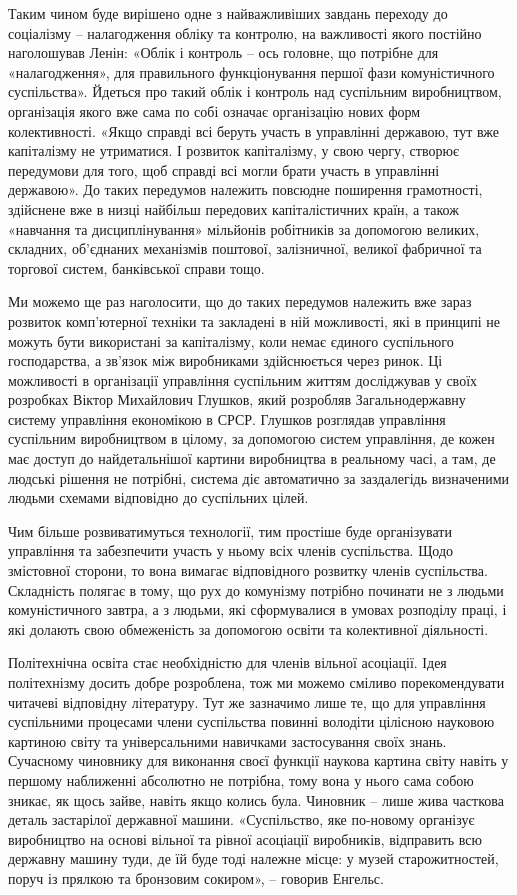 \documentclass[../main]{subfiles}
\begin{document}
Таким чином буде вирішено одне з найважливіших завдань переходу до соціалізму – налагодження обліку та контролю, на важливості якого постійно наголошував Ленін: «Облік і контроль – ось головне, що потрібне для «налагодження», для правильного функціонування першої фази комуністичного суспільства». Йдеться про такий облік і контроль над суспільним виробництвом, організація якого вже сама по собі означає організацію нових форм колективності. «Якщо справді всі беруть участь в управлінні державою, тут вже капіталізму не утриматися. І розвиток капіталізму, у свою чергу, створює передумови для того, щоб справді всі могли брати участь в управлінні державою». До таких передумов належить повсюдне поширення грамотності, здійснене вже в низці найбільш передових капіталістичних країн, а також «навчання та дисциплінування» мільйонів робітників за допомогою великих, складних, об’єднаних механізмів поштової, залізничної, великої фабричної та торгової систем, банківської справи тощо.

Ми можемо ще раз наголосити, що до таких передумов належить вже зараз розвиток комп’ютерної техніки та закладені в ній можливості, які в принципі не можуть бути використані за капіталізму, коли немає єдиного суспільного господарства, а зв’язок між виробниками здійснюється через ринок. Ці можливості в організації управління суспільним життям досліджував у своїх розробках Віктор Михайлович Глушков, який розробляв Загальнодержавну систему управління економікою в СРСР. Глушков розглядав управління суспільним виробництвом в цілому, за допомогою систем управління, де кожен має доступ до найдетальнішої картини виробництва в реальному часі, а там, де людські рішення не потрібні, система діє автоматично за заздалегідь визначеними людьми схемами відповідно до суспільних цілей.

Чим більше розвиватимуться технології, тим простіше буде організувати управління та забезпечити участь у ньому всіх членів суспільства. Щодо змістовної сторони, то вона вимагає відповідного розвитку членів суспільства. Складність полягає в тому, що рух до комунізму потрібно починати не з людьми комуністичного завтра, а з людьми, які сформувалися в умовах розподілу праці, і які долають свою обмеженість за допомогою освіти та колективної діяльності.

Політехнічна освіта стає необхідністю для членів вільної асоціації. Ідея політехнізму досить добре розроблена, тож ми можемо сміливо порекомендувати читачеві відповідну літературу. Тут же зазначимо лише те, що для управління суспільними процесами члени суспільства повинні володіти цілісною науковою картиною світу та універсальними навичками застосування своїх знань. Сучасному чиновнику для виконання своєї функції наукова картина світу навіть у першому наближенні абсолютно не потрібна, тому вона у нього сама собою зникає, як щось зайве, навіть якщо колись була. Чиновник – лише жива часткова деталь застарілої державної машини. «Суспільство, яке по-новому організує виробництво на основі вільної та рівної асоціації виробників, відправить всю державну машину туди, де їй буде тоді належне місце: у музей старожитностей, поруч із прялкою та бронзовим сокиром», – говорив Енгельс.
\end{document}
